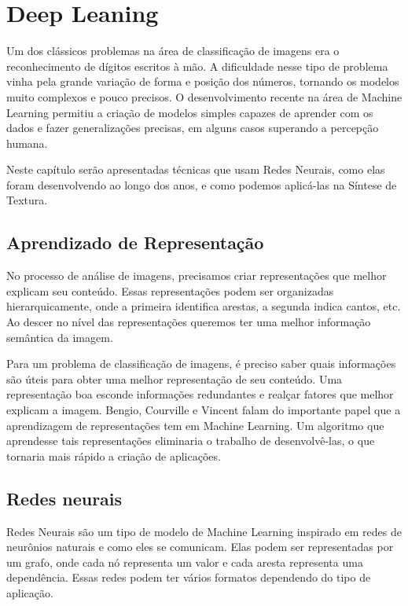 \chapter{Deep Leaning}


Um dos clássicos problemas na área
de classificação de imagens era o
reconhecimento de dígitos
escritos à mão. 
A dificuldade nesse tipo de problema
vinha pela grande variação de forma
e posição dos números, tornando 
os modelos muito complexos e pouco
precisos. O desenvolvimento
recente na área de Machine Learning
permitiu a criação de modelos
simples capazes de aprender com
os dados e fazer generalizações
precisas, em alguns casos
superando a percepção humana.

Neste capítulo serão apresentadas
técnicas que usam Redes Neurais,
como elas foram desenvolvendo
ao longo dos anos, e como podemos
aplicá-las na Síntese de Textura.



\section{Aprendizado de Representação}


No processo de análise de imagens,
precisamos criar representações
que melhor explicam seu conteúdo.
Essas representações podem ser organizadas
hierarquicamente, onde
a primeira identifica
arestas, a segunda indica cantos, etc.
Ao descer no nível das representações
queremos ter uma melhor informação
semântica da imagem.


Para um problema de classificação de imagens,
é preciso saber quais informações são 
úteis para obter uma melhor 
representação de seu conteúdo. 
Uma representação boa esconde informações
redundantes e realçar fatores que 
melhor explicam a imagem.
Bengio, Courville e Vincent
\cite{Bengio2014} falam do importante
papel que a aprendizagem
de representações tem em Machine Learning.
Um algoritmo que aprendesse tais representações
eliminaria o trabalho de desenvolvê-las,
o que tornaria mais rápido a criação de aplicações.


\section{Redes neurais}



Redes Neurais são um tipo 
de modelo de Machine Learning inspirado
em redes de neurônios naturais e como
eles se comunicam. Elas podem ser
representadas por um grafo, onde
cada nó representa um valor e cada aresta
representa uma dependência. Essas
redes podem ter vários formatos
dependendo do tipo de aplicação.


